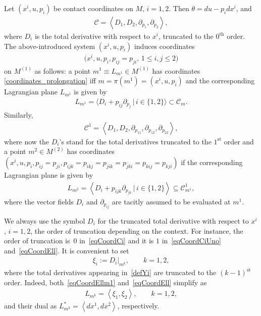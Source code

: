 \documentclass[10pt,a4paper]{amsart}
\newcommand{\C}{\mathcal{C}}
\newcommand{\CC}{\mathcal{C}^{1}}
\newcommand{\Span}[1]{\left\langle #1 \right\rangle}
\newcommand{\Th}{^\textrm{th}}
\newcommand{\St}{^\textrm{st}}
\numberwithin{equation}{section}
\begin{document}
Let $(x^i, u, p_i)$ be contact coordinates on $M$, $i=1, 2$. Then
$\theta = du - p_i dx^i$, and
\begin{gather}\label{eqCoordCi}
\C = \Span{D_1,D_2, \partial_{p_1},\partial_{p_2}},
\end{gather}
where $D_i$ is the total derivative with respect to $x^i$, truncated to the $0\Th$ order. The above-introduced system $(x^i,u,p_i)$ induces coordinates
\begin{gather}\label{coordinates_prolongation}
\big(x^i, u, p_i, p_{ij}= p_{ji} ,\, 1 \leq i, j \leq 2 \big)
\end{gather}
on $M^{(1)}$ as follows: a point $m^1 \equiv L_{m^1} \in M^{(1)}$
has coordinates \eqref{coordinates_prolongation} if\/f $m=\pi(m^1)=(x^i,u,p_i)$ and the
corresponding Lagrangian plane $L_{m^1}$ is given by
\begin{gather}\label{eqCoordEllm1}
L_{m^1}=\langle D_i + p_{ij}\partial_{p_{j}}\,| \,i\in\{1,2\}\rangle\subset\mathcal{C}_{m}.
\end{gather}
Similarly,
\begin{gather}\label{eqCoordCiUno}
\CC=\Span{D_1,D_2, \partial_{p_{11}},\partial_{p_{12}},\partial_{p_{22}}},
\end{gather}
where now the $D_i$'s stand for the total derivatives truncated to the $1\St$ order and a point $m^2\in M^{(2)}$ has coordinates $(x^i,u,p_i,p_{ij}=p_{ji},p_{ijk}=p_{ikj}=p_{jik}=p_{jki}=p_{kij}=p_{kji})$ if the corresponding Lagrangian plane is given by
\begin{gather}\label{eqCoordEll}
L_{m^2}=\Span{ D_i+ p_{ijk}\partial_{p_{jk}}\,| \,i\in\{1,2\}}\subseteq \C^1_{m^1},
\end{gather}
where the vector f\/ields $D_i$ and $\partial_{p_{ij}}$ are tacitly assumed to be evaluated at $m^1$.

\begin{Remark}\label{remcoordELLE}
We always use the symbol $D_i$ for the truncated total derivative with respect to $x^i$, $i=1,2$, the order of truncation depending on the context. For instance, the order of truncation is~$0$ in~\eqref{eqCoordCi} and it is $1$ in~\eqref{eqCoordCiUno} and~\eqref{eqCoordEll}.
It is convenient to set
 \begin{gather}\label{defYi}
\xi_i:=\left. D_i\right|_{m^k},\qquad k=1,2,
\end{gather}
where the total derivatives appearing in~\eqref{defYi} are truncated to the $(k-1)\St$ order. Indeed, both~\eqref{eqCoordEllm1}
and~\eqref{eqCoordEll} simplify as
\begin{gather}
L_{m^k}=\Span{ \xi_1,\xi_2 },\qquad k=1,2,\label{coordELLE}
\end{gather}
and their dual as
$L_{m^k}^\ast=\Span{dx^1,dx^2}$,
respectively.
\end{Remark}
\end{document}
